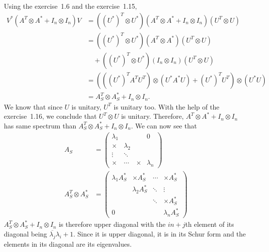 \begin{solution}
  Using the exercise~1.6 and the exercise~1.15,
  \begin{align*}
    V^* (A^T \otimes A^* + I_n \otimes I_n) V
    & = ((U^*)^T \otimes U^*) (A^T \otimes A^* + I_n \otimes I_n) (U^T \otimes U)\\
    & = ((U^*)^T \otimes U^*) (A^T \otimes A^*) (U^T \otimes U)\\
    & \quad + ((U^*)^T \otimes U^*) (I_n \otimes I_n) (U^T \otimes U)\\
    & = (((U^*)^TA^TU^T) \otimes (U^*A^*U) + (U^*)^TU^T) \otimes (U^*U)\\
    & = A_S^T \otimes A_S^* + I_n \otimes I_n.
  \end{align*}
  We know that since $U$ is unitary, $U^T$ is unitary too.
  With the help of the exercise~1.16, we conclude that $U^T \otimes U$ is unitary.
  Therefore,
  $A^T \otimes A^* + I_n \otimes I_n$ has same spectrum than
  $A_S^T \otimes A_S^* + I_n \otimes I_n$.
  We can now see that
  \begin{align*}
    A_S & =
    \begin{pmatrix}
      \lambda_1 &           &        & 0\\
      \times    & \lambda_2 &        & \\
      \vdots    & \ddots    &        & \\
      \times    & \cdots    & \times & \lambda_n
    \end{pmatrix}\\
    A_S^T \otimes A_S^* & =
    \begin{pmatrix}
      \lambda_1 A_S^* & \times A_S^*    & \cdots & \times A_S^*\\
                      & \lambda_2 A_S^* & \ddots & \vdots\\
                      &                 & \ddots & \times A_S^*\\
      0               &                 &        & \lambda_n A_S^*
    \end{pmatrix}
  \end{align*}
  $A_S^T \otimes A_S^* + I_n \otimes I_n$ is therefore
  upper diagonal with the $in + j$th element of its
  diagonal being $\overline{\lambda_j}\lambda_i + 1$.
  Since it is upper diagonal, it is in its Schur form
  and the elements in its diagonal are its eigenvalues.
\end{solution}


